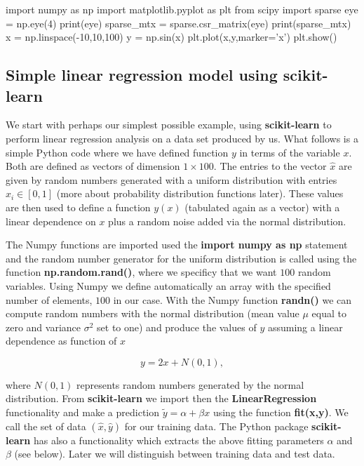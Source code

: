 \documentclass[%
oneside,                 %
final,                   %
10pt]{article}
\begin{document}
\bpycod
import numpy as np
import matplotlib.pyplot as plt
from scipy import sparse
eye = np.eye(4)
print(eye)
sparse_mtx = sparse.csr_matrix(eye)
print(sparse_mtx)
x = np.linspace(-10,10,100)
y = np.sin(x)
plt.plot(x,y,marker='x')
plt.show()
\epycod








\subsection{Simple linear regression model using \textbf{scikit-learn}}

We start with perhaps our simplest possible example, using \textbf{scikit-learn} to perform linear regression analysis on a data set produced by us. 
What follows is a simple Python code where we have defined  function $y$ in terms of the variable $x$. Both are defined as vectors of dimension $1\times 100$. The entries to the vector $\hat{x}$  are given by random numbers generated with a uniform distribution with entries $x_i \in [0,1]$ (more about probability distribution functions later). These values are then used to define a function $y(x)$ (tabulated again as a vector) with a linear dependence on $x$ plus a random noise added via the normal distribution.


The Numpy functions are imported used the \textbf{import numpy as np}
statement and the random number generator for the uniform distribution
is called using the function \textbf{np.random.rand()}, where we specificy
that we want $100$ random variables.  Using Numpy we define
automatically an array with the specified number of elements, $100$ in
our case.  With the Numpy function \textbf{randn()} we can compute random
numbers with the normal distribution (mean value $\mu$ equal to zero and
variance $\sigma^2$ set to one) and produce the values of $y$ assuming a linear
dependence as function of $x$

\[
y = 2x+N(0,1),
\]

where $N(0,1)$ represents random numbers generated by the normal
distribution.  From \textbf{scikit-learn} we import then the
\textbf{LinearRegression} functionality and make a prediction $\tilde{y} =
\alpha + \beta x$ using the function \textbf{fit(x,y)}. We call the set of
data $(\hat{x},\hat{y})$ for our training data. The Python package
\textbf{scikit-learn} has also a functionality which extracts the above
fitting parameters $\alpha$ and $\beta$ (see below). Later we will
distinguish between training data and test data.
\end{document}
